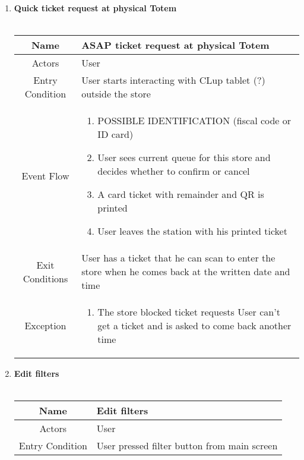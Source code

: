 \begin{enumerate}
\item \textbf{Quick ticket request at physical Totem}\\\\

\begin{table}[H]
{
	\begin{tabular}{|c|p{14cm}|}
		\hline
		Name & ASAP ticket request at physical Totem\\
		\hline
		Actors & User\\
		\hline
		Entry Condition & User starts interacting with CLup tablet (?) outside the store\\
		\hline
		
		Event Flow & \begin{enumerate}
			\item POSSIBLE IDENTIFICATION (fiscal code or ID card)
			\item User sees current queue for this store and decides whether to confirm or cancel
			\item A card ticket with remainder and QR is printed
			\item User leaves the station with his printed ticket
			
		\end{enumerate}\\
		
		\hline
		Exit Conditions & User has a ticket that he can scan to enter the store when he comes back at the written date and time\\
		\hline
		
		Exception & \begin{enumerate}
			\item The store blocked ticket requests\newline
			User can’t get a ticket and is asked to come back another time
			
		\end{enumerate}\\
		
		\hline
	\end{tabular}
}
\end{table}

\item \textbf{Edit filters}\\\\

\begin{table}[H]
{
	\begin{tabular}{|c|p{14cm}|}
		\hline
		Name & Edit filters\\
		\hline
		Actors & User\\
		\hline
		Entry Condition & User pressed filter button from main screen\\
		\hline
		

\end{tabular}}
\end{table}
\end{enumerate}
